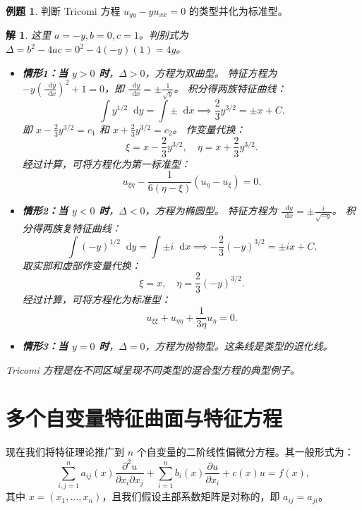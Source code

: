 \documentclass[12pt,a4paper]{article}
\newcommand{\diff}{\mathop{}\!\mathrm{d}}
\numberwithin{subsection}{section}   %
\numberwithin{subsubsection}{subsection}
\theoremstyle{plain}
\newtheorem{solution}{解}[subsection]  %
\theoremstyle{definition}
\newtheorem{example}{例题}[subsection]  %
\theoremstyle{remark}
\theoremstyle{remark}
\begin{document}
	\begin{example}
		判断 Tricomi 方程 \(u_{yy} - y u_{xx} = 0\) 的类型并化为标准型。
	\end{example}
	\begin{solution}
		这里 \(a=-y, b=0, c=1\)。判别式为 \(\Delta = b^2-4ac = 0^2 - 4(-y)(1) = 4y\)。
		\begin{itemize}
			\item \textbf{情形1：当 \(y > 0\) 时}，\(\Delta > 0\)，方程为双曲型。
			特征方程为 \(-y (\frac{\diff y}{\diff x})^2 + 1 = 0\)，即 \(\frac{\diff y}{\diff x} = \pm \frac{1}{\sqrt{y}}\)。
			积分得两族特征曲线：
			\[
			\int y^{1/2} \diff y = \int \pm \diff x \implies \frac{2}{3}y^{3/2} = \pm x + C.
			\]
			即 \( x - \frac{2}{3}y^{3/2} = c_1 \) 和 \( x + \frac{2}{3}y^{3/2} = c_2 \)。
			作变量代换：
			\[ \xi = x - \frac{2}{3}y^{3/2}, \quad \eta = x + \frac{2}{3}y^{3/2}. \]
			经过计算，可将方程化为第一标准型：
			\[ u_{\xi\eta} - \frac{1}{6(\eta-\xi)}(u_\eta - u_\xi) = 0. \]
			
			\item \textbf{情形2：当 \(y < 0\) 时}，\(\Delta < 0\)，方程为椭圆型。
			特征方程为 \(\frac{\diff y}{\diff x} = \pm \frac{i}{\sqrt{-y}}\)。
			积分得两族复特征曲线：
			\[
			\int (-y)^{1/2} \diff y = \int \pm i \diff x \implies -\frac{2}{3}(-y)^{3/2} = \pm ix + C.
			\]
			取实部和虚部作变量代换：
			\[ \xi = x, \quad \eta = \frac{2}{3}(-y)^{3/2}. \]
			经过计算，可将方程化为标准型：
			\[ u_{\xi\xi} + u_{\eta\eta} + \frac{1}{3\eta}u_\eta = 0. \]
			
			\item \textbf{情形3：当 \(y = 0\) 时}，\(\Delta = 0\)，方程为抛物型。这条线是类型的退化线。
		\end{itemize}
		Tricomi 方程是在不同区域呈现不同类型的混合型方程的典型例子。
	\end{solution}
	
	\newpage
	\section{多个自变量特征曲面与特征方程}
	现在我们将特征理论推广到 \(n\) 个自变量的二阶线性偏微分方程。其一般形式为：
	\begin{equation}\label{eq:pde_n_vars}
		\sum_{i,j=1}^{n} a_{ij}(x) \frac{\partial^2 u}{\partial x_i \partial x_j} + \sum_{i=1}^{n} b_i(x) \frac{\partial u}{\partial x_i} + c(x) u = f(x),
	\end{equation}
	其中 \(x=(x_1, \dots, x_n)\)，且我们假设主部系数矩阵是对称的，即 \(a_{ij} = a_{ji}\)。
	
\end{document}
